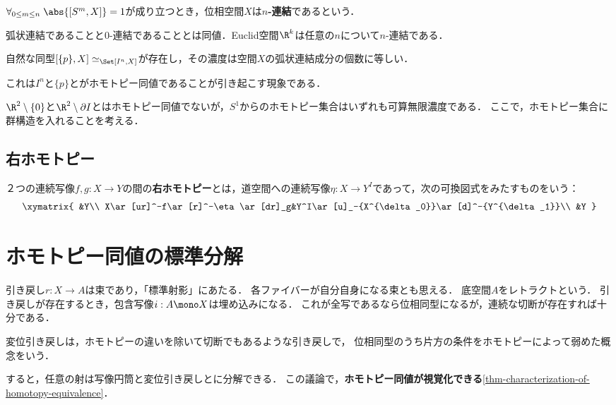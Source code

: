\documentclass[uplatex, dvipdfmx]{jsreport}
\begin{document}
\begin{definition}
    $\forall_{0\le m\le n}\;\abs{[S^m,X]}=1$が成り立つとき，位相空間$X$は\textbf{$n$-連結}であるという．
\end{definition}
\begin{remarks}
    弧状連結であることと$0$-連結であることとは同値．Euclid空間$\R^k$は任意の$n$について$n$-連結である．
\end{remarks}

\begin{lemma}
    自然な同型$[\{p\},X]\simeq_\Set[I^n,X]$が存在し，その濃度は空間$X$の弧状連結成分の個数に等しい．
\end{lemma}
\begin{remarks}
    これは$I^n$と$\{p\}$とがホモトピー同値であることが引き起こす現象である．
\end{remarks}

\begin{discussion}
    $\R^2\setminus\{0\}$と$\R^2\setminus\partial I$とはホモトピー同値でないが，$S^1$からのホモトピー集合はいずれも可算無限濃度である．
    ここで，ホモトピー集合に群構造を入れることを考える．
\end{discussion}

\subsection{右ホモトピー}

\begin{definition}
    ２つの連続写像$f,g:X\to Y$の間の\textbf{右ホモトピー}とは，道空間への連続写像$\eta:X\to Y^I$であって，次の可換図式をみたすものをいう：
    \[\xymatrix{
        &Y\\
        X\ar[ur]^-f\ar[r]^-\eta\ar[dr]_g&Y^I\ar[u]_-{X^{\delta_0}}\ar[d]^-{Y^{\delta_1}}\\
        &Y
    }\]
\end{definition}

\section{ホモトピー同値の標準分解}

\begin{tcolorbox}[colframe=ForestGreen, colback=ForestGreen!10!white,breakable,colbacktitle=ForestGreen!40!white,coltitle=black,fonttitle=\bfseries\sffamily,
title=空間の変位レトラクトとは，全体空間をそこに連続的に縮めることが出来る部分空間である]
    引き戻し$r:X\to A$は束であり，「標準射影」にあたる．
    各ファイバーが自分自身になる束とも思える．
    底空間$A$をレトラクトという．
    引き戻しが存在するとき，包含写像$i:A\mono X$は埋め込みになる．
    これが全写であるなら位相同型になるが，連続な切断が存在すれば十分である．

    変位引き戻しは，ホモトピーの違いを除いて切断でもあるような引き戻しで，
    位相同型のうち片方の条件をホモトピーによって弱めた概念をいう．

    すると，任意の射は写像円筒と変位引き戻しとに分解できる．
    この議論で，\textbf{ホモトピー同値が視覚化できる}\ref{thm-characterization-of-homotopy-equivalence}．
\end{tcolorbox}
\end{document}
